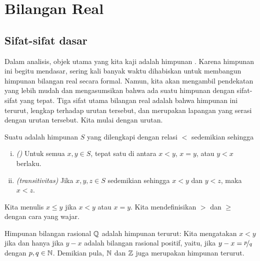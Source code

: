 \chapter{Bilangan Real} \label{rn:chapter}


\section{Sifat-sifat dasar} \label{sec:basicpropsrn}


Dalam analisis, objek utama yang kita kaji adalah himpunan
.  Karena himpunan ini begitu mendasar, sering kali banyak
waktu dihabiskan untuk membangun himpunan bilangan real secara formal.  Namun, kita
akan mengambil pendekatan yang lebih mudah dan mengasumsikan bahwa ada suatu himpunan
dengan sifat-sifat yang tepat.
Tiga sifat utama bilangan real adalah bahwa himpunan ini
terurut, lengkap terhadap urutan tersebut,
dan merupakan lapangan yang serasi dengan urutan tersebut.
Kita mulai dengan urutan.

\begin{defn}
Suatu \emph{} adalah himpunan $S$ yang dilengkapi
dengan relasi $<$ sedemikian sehingga
\begin{enumerate}[(i)]
\item \emph{()} Untuk semua $x, y \in S$, tepat satu di antara
$x < y$, $x=y$, atau $y < x$ berlaku.
\item \emph{(transitivitas)} Jika $x,y,z \in S$ sedemikian sehingga $x < y$ dan $y
< z$, maka $x < z$.
\end{enumerate}
Kita menulis $x \leq y$ jika $x < y$ atau $x=y$.  Kita mendefinisikan
$>$ dan $\geq$ dengan cara yang wajar.
\end{defn}


Himpunan bilangan rasional ${\mathbb{Q}}$ adalah himpunan terurut: Kita mengatakan
$x < y$ jika dan hanya jika $y-x$ adalah bilangan rasional positif, yaitu,
jika $y-x = \nicefrac{p}{q}$ dengan $p,q \in {\mathbb{N}}$.  Demikian pula,
${\mathbb{N}}$ dan ${\mathbb{Z}}$ juga merupakan himpunan terurut.

